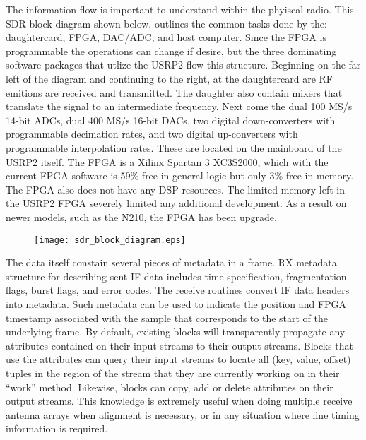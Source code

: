 The information flow is important to understand within the phyiscal radio.  This SDR block diagram shown below, outlines the common tasks done by the: daughtercard, FPGA, DAC/ADC, and host computer.  Since the FPGA is programmable the operations can change if desire, but the three dominating software packages that utlize the USRP2 flow this structure.  Beginning on the far left of the diagram and continuing to the right, at the daughtercard are RF emitions are received and transmitted.  The daughter also contain mixers that translate the signal to an intermediate frequency.  Next come the dual 100 MS/s 14-bit ADCs, dual 400 MS/s 16-bit DACs, two digital down-converters with programmable decimation rates, and two digital up-converters with programmable interpolation rates\cite{USPR2Stats}.  These are located on the mainboard of the USRP2 itself.  The FPGA is a Xilinx Spartan 3 XC3S2000, which with the current FPGA software is 59\% free in general logic but only 3\% free in memory.  The FPGA also does not have any DSP resources.  The limited memory left in the USRP2 FPGA severely limited any additional development.  As a result on newer models, such as the N210, the FPGA has been upgrade.\cite{n210spec}\\

\begin{figure}
\texttt{[image: sdr\_block\_diagram.eps]}
\cite{sdr_blocks}
\end{figure}

The data itself constain several pieces of metadata in a frame.  RX metadata structure for describing sent IF data includes time specification, fragmentation flags, burst flags, and error codes. The receive routines convert IF data headers into metadata\cite{metadata}.  Such metadata can be used to indicate the position and FPGA timestamp associated with the sample that corresponds to the start of the underlying frame. By default, existing blocks will transparently propagate any attributes contained on their input streams to their output streams. Blocks that use the attributes can query their input streams to locate all (key, value, offset) tuples in the region of the stream that they are currently working on in their “work” method. Likewise, blocks can copy, add or delete attributes on their output streams\cite{sdr_blog}.  This knowledge is extremely useful when doing multiple receive antenna arrays when alignment is necessary, or in any situation where fine timing information is required.\\

